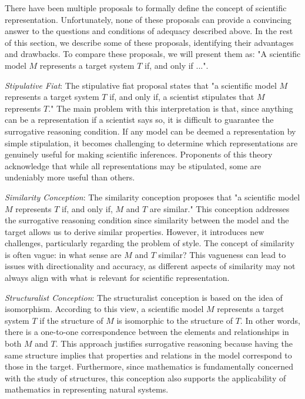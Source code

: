 There have been multiple proposals to formally define the concept of scientific representation. Unfortunately, none of these proposals can provide a convincing answer to the questions and conditions of adequacy described above. In the rest of this section, we describe some of these proposals, identifying their advantages and drawbacks. To compare these proposals, we will present them as: "A scientific model $M$ represents a target system $T$ if, and only if ...".

\emph{Stipulative Fiat}: The stipulative fiat proposal states that "a scientific model $M$ represents a target system $T$ if, and only if, a scientist stipulates that $M$ represents $T$." The main problem with this interpretation is that, since anything can be a representation if a scientist says so, it is difficult to guarantee the surrogative reasoning condition. If any model can be deemed a representation by simple stipulation, it becomes challenging to determine which representations are genuinely useful for making scientific inferences. Proponents of this theory acknowledge that while all representations may be stipulated, some are undeniably more useful than others.

\emph{Similarity Conception}: The similarity conception proposes that "a scientific model $M$ represents $T$ if, and only if, $M$ and $T$ are similar." This conception addresses the surrogative reasoning condition since similarity between the model and the target allows us to derive similar properties. However, it introduces new challenges, particularly regarding the problem of style. The concept of similarity is often vague: in what sense are $M$ and $T$ similar? This vagueness can lead to issues with directionality and accuracy, as different aspects of similarity may not always align with what is relevant for scientific representation.

\emph{Structuralist Conception}: The structuralist conception is based on the idea of isomorphism. According to this view, a scientific model $M$ represents a target system $T$ if the structure of $M$ is isomorphic to the structure of $T$. In other words, there is a one-to-one correspondence between the elements and relationships in both $M$ and $T$. This approach justifies surrogative reasoning because having the same structure implies that properties and relations in the model correspond to those in the target. Furthermore, since mathematics is fundamentally concerned with the study of structures, this conception also supports the applicability of mathematics in representing natural systems.

